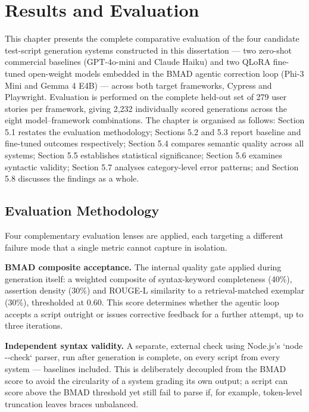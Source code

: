 \chapter{Results and Evaluation}

This chapter presents the complete comparative evaluation of the four
candidate test-script generation systems constructed in this
dissertation --- two zero-shot commercial baselines (GPT-4o-mini and
Claude Haiku) and two QLoRA fine-tuned open-weight models embedded in
the BMAD agentic correction loop (Phi-3 Mini and Gemma 4 E4B) --- across
both target frameworks, Cypress and Playwright. Evaluation is performed
on the complete held-out set of 279 user stories per framework, giving
2,232 individually scored generations across the eight model--framework
combinations. The chapter is organised as follows: Section 5.1 restates
the evaluation methodology; Sections 5.2 and 5.3 report baseline and
fine-tuned outcomes respectively; Section 5.4 compares semantic quality
across all systems; Section 5.5 establishes statistical significance;
Section 5.6 examines syntactic validity; Section 5.7 analyses
category-level error patterns; and Section 5.8 discusses the findings as
a whole.

\section{Evaluation Methodology}

Four complementary evaluation lenses are applied, each targeting a
different failure mode that a single metric cannot capture in isolation.

\textbf{BMAD composite acceptance.} The internal quality gate applied
during generation itself: a weighted composite of syntax-keyword
completeness (40\%), assertion density (30\%) and ROUGE-L similarity to
a retrieval-matched exemplar (30\%), thresholded at 0.60. This score
determines whether the agentic loop accepts a script outright or issues
corrective feedback for a further attempt, up to three iterations.

\textbf{Independent syntax validity.} A separate, external check using
Node.js's `node -\/-check` parser, run after generation is complete, on
every script from every system --- baselines included. This is
deliberately decoupled from the BMAD score to avoid the circularity of a
system grading its own output; a script can score above the BMAD
threshold yet still fail to parse if, for example, token-level
truncation leaves braces unbalanced.

